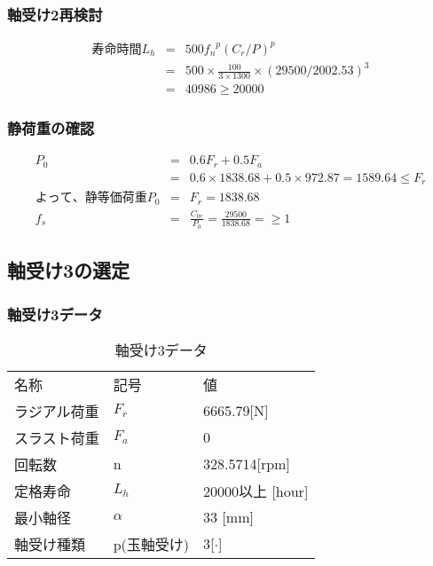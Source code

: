\subsubsection{軸受け2再検討}
\begin{eqnarray}
寿命時間L_h &=& 500{f_n}^p(C_r/P)^p\\
           &=& 500 \times \frac{100}{3 \times 1300} \times (29500/2002.53)^3\\
           &=& 40986 \geq 20000
\end{eqnarray}

\subsubsection{静荷重の確認}
\begin{eqnarray}
P_0 &=& 0.6F_r+0.5F_a\\
    &=& 0.6 \times 1838.68 + 0.5 \times 972.87 = 1589.64 \leq F_r\\
よって、静等価荷重P_0 &=& F_r = 1838.68\\
f_s &=& \frac{C_{0r}}{P_0} = \frac{29500}{1838.68} = \geq 1
\end{eqnarray}




\newpage
\subsection{軸受け3の選定}

\subsubsection{軸受け3データ}
\begin{table}[htb]
\begin{center}
  \caption{軸受け3データ}
  \begin{tabular}{lll} \hline
名称&記号&値\\
ラジアル荷重&$F_r$&6665.79[N]\\
スラスト荷重&$F_a$&0\\
回転数&n&328.5714[rpm]\\
定格寿命&$L_h$&20000以上 [hour]\\
最小軸径&$\alpha$&33 [mm]\\
軸受け種類&p(玉軸受け)&3[$\cdot$]\\
\hline
  \end{tabular}
\end{center}
\end{table}

